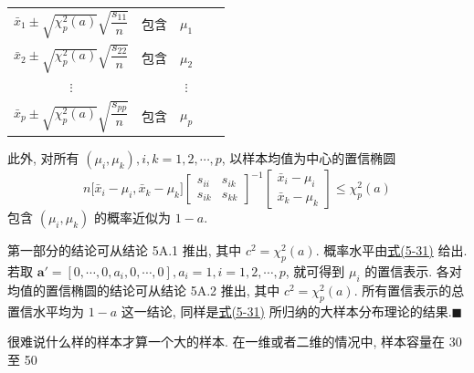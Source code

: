 \begin{center}
\begin{tabular}{ccccc}
$\bar{x}_{1}\pm\sqrt{\chi_{p}^{2}(a)}\sqrt{\dfrac{s_{11}}{n}}$ & 包含 & $\mu_{1}$ & &\\[10pt]
$\bar{x}_{2}\pm\sqrt{\chi_{p}^{2}(a)}\sqrt{\dfrac{s_{22}}{n}}$ & 包含 & $\mu_{2}$ & &\\[10pt]
$\vdots$ & & $\vdots$ & &\\[6pt]
$\bar{x}_{p}\pm\sqrt{\chi_{p}^{2}(a)}\sqrt{\dfrac{s_{pp}}{n}}$ & 包含 & $\mu_{p}$ & &
\end{tabular}
\end{center}

此外, 对所有 $(\mu_{i},\mu_{k}),i,k=1,2,\cdots,p$, 以样本均值为中心的置信椭圆
\[
n\bigl[\bar{x}_{i}-\mu_{i},\bar{x}_{k}-\mu_{k}\bigr]
\begin{bmatrix}s_{ii}&s_{ik}\\s_{ik}&s_{kk}\end{bmatrix}^{-1}
\begin{bmatrix}\bar{x}_{i}-\mu_{i}\\\bar{x}_{k}-\mu_{k}\end{bmatrix}\le\chi_{p}^{2}(a)
\]
包含 $(\mu_{i},\mu_{k})$ 的概率近似为 $1-a$.

\medskip
\noindent{}\quad 第一部分的结论可从结论 5A.1 推出, 其中 $c^{2}=\chi_{p}^{2}(a)$. 概率水平由\hyperref[eq:5-31]{式(5-31)} 给出. 若取 $\mathbf{a}'=[0,\cdots,0,a_{i},0,\cdots,0],a_{i}=1,i=1,2,\cdots,p$, 就可得到 $\mu_{i}$ 的置信表示. 各对均值的置信椭圆的结论可从结论 5A.2 推出, 其中 $c^{2}=\chi_{p}^{2}(a)$. 所有置信表示的总置信水平均为 $1-a$ 这一结论, 同样是\hyperref[eq:5-31]{式(5-31)} 所归纳的大样本分布理论的结果.\hfill$\blacksquare$

很难说什么样的样本才算一个大的样本. 在一维或者二维的情况中, 样本容量在 30 至 50
